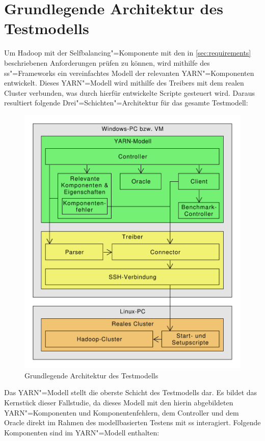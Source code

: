 \section{Grundlegende Architektur des Testmodells}
\label{sec:modelArchitecture}

Um Hadoop mit der Selfbalancing"=Komponente mit den in \cref{sec:requirements} beschriebenen Anforderungen prüfen zu können, wird mithilfe des \gls{ss}"=Frameworks ein vereinfachtes Modell der relevanten YARN"=Komponenten entwickelt.
Dieses YARN"=Modell wird mithilfe des Treibers mit dem realen Cluster verbunden, was durch hierfür entwickelte Scripte gesteuert wird.
Daraus resultiert folgende Drei"=Schichten"=Architektur für das gesamte Testmodell:

\begin{figure}[h]
    \includegraphics[width=0.6\columnwidth]{./resources/modelArchitecture.pdf}
    \caption{Grundlegende Architektur des Testmodells}
    \label{fig:modelArchitecture}
\end{figure}

Das YARN"=Modell stellt die oberste Schicht des Testmodells dar.
Es bildet das Kernstück dieser Fallstudie, da dieses Modell mit den hierin abgebildeten YARN"=Komponenten und Komponentenfehlern, dem Controller und dem Oracle direkt im Rahmen des modellbasierten Testens mit \gls{ss} interagiert.
Folgende Komponenten sind im YARN"=Modell enthalten:

